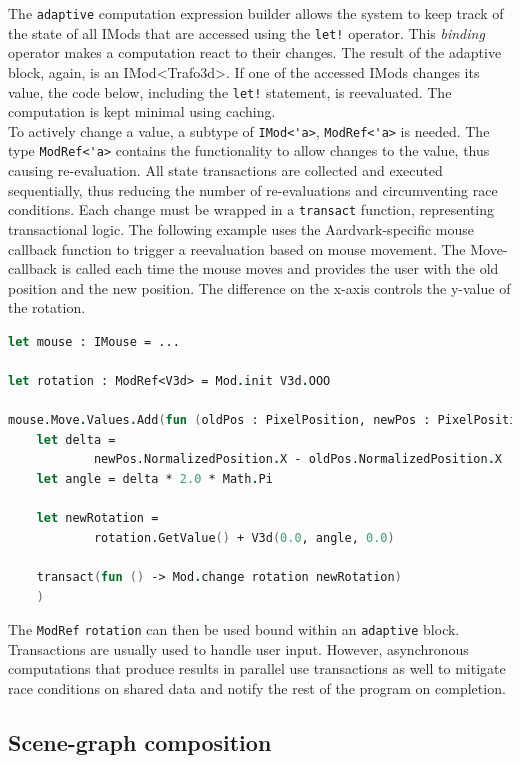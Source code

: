The \verb|adaptive| computation expression builder allows the system to keep track of the state of all IMods that are accessed using the \verb|let!| operator. This \textit{binding} operator makes a computation react to their changes. The result of the adaptive block, again, is an IMod<Trafo3d>. If one of the accessed IMods changes its value, the code below, including the \verb|let!| statement, is reevaluated. The computation is kept minimal using caching. 
\\

To actively change a value, a subtype of \verb|IMod<'a>|, \verb|ModRef<'a>| is needed. The type \verb|ModRef<'a>| contains the functionality to allow changes to the value, thus causing re-evaluation. All state transactions are collected and executed sequentially, thus reducing the number of re-evaluations and circumventing race conditions. Each change must be wrapped in a \verb|transact| function, representing transactional logic. 
The following example uses the Aardvark-specific mouse callback function to trigger a reevaluation based on mouse movement. The Move-callback is called each time the mouse moves and provides the user with the old position and the new position. The difference on the x-axis controls the y-value of the rotation. 

\begin{lstlisting}[language = FSharp]
let mouse : IMouse = ...

let rotation : ModRef<V3d> = Mod.init V3d.OOO

mouse.Move.Values.Add(fun (oldPos : PixelPosition, newPos : PixelPosition) -> 
    let delta = 
            newPos.NormalizedPosition.X - oldPos.NormalizedPosition.X
    let angle = delta * 2.0 * Math.Pi
    
    let newRotation = 
            rotation.GetValue() + V3d(0.0, angle, 0.0)
    
    transact(fun () -> Mod.change rotation newRotation)
    )
\end{lstlisting}

The \verb|ModRef| \verb|rotation| can then be used bound within an \verb|adaptive| block.
\\
Transactions are usually used to handle user input. However, asynchronous computations that produce results in parallel use transactions as well to mitigate race conditions on shared data and notify the rest of the program on completion. 


\subsection{Scene-graph composition}
\label{sec:isg}

